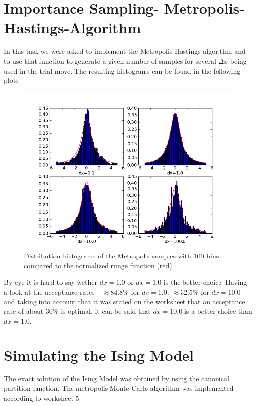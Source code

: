 \documentclass[12pt,a4paper]{scrartcl}
\begin{document}
\section{Importance Sampling- Metropolis-Hastings-Algorithm}
In this task we were asked to implement the Metropolis-Hastings-algorithm and to use that function to generate a given number of samples for several $\Delta x$ being used in the trial move.
The resulting histograms can be found in the following plots
 \begin{figure}[H]
\centering
\includegraphics[width=16.0cm]{../plots/hist.png}
\caption{Distribution histograms of the Metropolis samples with 100 bins compared to the normalized runge function (red)}
\label{fig:runge}
\end{figure}
By eye it is hard to say wether $dx = 1.0$ or $dx= 1.0$ is the better choice. Having a look at the acceptance rates - $\approx 84.8\%$ for $ dx=1.0$, $\approx 32.5\%$ for $dx=10.0$  -and taking into account that it was stated on the worksheet that an acceptance rate of about $30\%$ is optimal, it can be said that $dx = 10.0 $ is a better choice than $dx= 1.0$.

\section{Simulating the Ising Model}

The exact solution of the Ising Model was obtained by using the canonical partition function. The metropolis Monte-Carlo algorithm was implemented according to worksheet 5.\\
\end{document}
